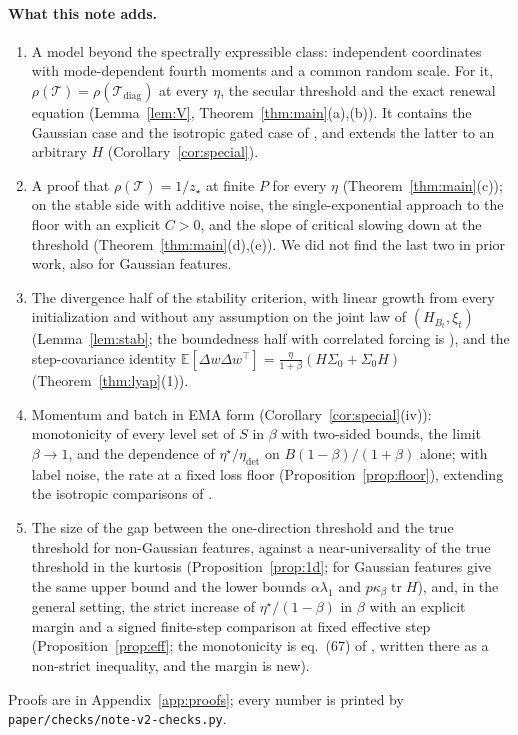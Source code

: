 \documentclass[11pt]{article}
\theoremstyle{remark}
\newcommand{\E}{\mathbb{E}}
\newcommand{\tr}{\operatorname{tr}}
\newcommand{\T}{\mathcal T}
\begin{document}
\paragraph{What this note adds.}
\begin{enumerate}
\item A model beyond the spectrally expressible class: independent coordinates with mode-dependent fourth moments and a common random scale. For it, $\rho(\T)=\rho(\T_{\mathrm{diag}})$ at every $\eta$, the secular threshold and the exact renewal equation (Lemma~\ref{lem:V}, Theorem~\ref{thm:main}(a),(b)). It contains the Gaussian case and the isotropic gated case of \citet{everett2026sparse}, and extends the latter to an arbitrary $H$ (Corollary~\ref{cor:special}).
\item A proof that $\rho(\T)=1/z_\star$ at finite $P$ for every $\eta$ (Theorem~\ref{thm:main}(c)); on the stable side with additive noise, the single-exponential approach to the floor with an explicit $C>0$, and the slope of critical slowing down at the threshold (Theorem~\ref{thm:main}(d),(e)). We did not find the last two in prior work, also for Gaussian features.
\item The divergence half of the stability criterion, with linear growth from every initialization and without any assumption on the joint law of $(H_{B_t},\xi_t)$ (Lemma~\ref{lem:stab}; the boundedness half with correlated forcing is \citet[Proposition~C.3]{cai2026llm}), and the step-covariance identity $\E[\Delta w\Delta w^\top]=\frac{\eta}{1+\beta}(H\Sigma_0+\Sigma_0H)$ (Theorem~\ref{thm:lyap}(1)).
\item Momentum and batch in EMA form (Corollary~\ref{cor:special}(iv)): monotonicity of every level set of $S$ in $\beta$ with two-sided bounds, the limit $\beta\to1$, and the dependence of $\eta^\star/\eta_{\mathrm{det}}$ on $B(1-\beta)/(1+\beta)$ alone; with label noise, the rate at a fixed loss floor (Proposition~\ref{prop:floor}), extending the isotropic comparisons of \citet[Proposition~H.10, Lemma~C.5]{everett2026sparse}.
\item The size of the gap between the one-direction threshold and the true threshold for non-Gaussian features, against a near-universality of the true threshold in the kurtosis (Proposition~\ref{prop:1d}; for Gaussian features \citet[eq.~(57)]{wang2026momentum} give the same upper bound and the lower bounds $\alpha\lambda_1$ and $p\kappa_\beta\tr H$), and, in the general setting, the strict increase of $\eta^\star/(1-\beta)$ in $\beta$ with an explicit margin and a signed finite-step comparison at fixed effective step (Proposition~\ref{prop:eff}; the monotonicity is eq.~(67) of \citet{cai2026llm}, written there as a non-strict inequality, and the margin is new).
\end{enumerate}
Proofs are in Appendix~\ref{app:proofs}; every number is printed by \texttt{paper/checks/note-v2-checks.py}.
\end{document}
